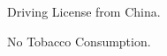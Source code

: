 \documentclass[letterpaper,12pt]{letter}
\begin{document}


\begin{shortitemize}
\item \textrm{\normalsize Driving License from China.}
\item \textrm{\normalsize No Tobacco Consumption.}
\end{shortitemize}


\end{document}
